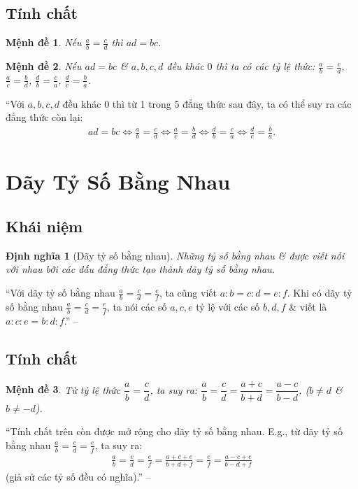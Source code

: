 \documentclass[oneside]{book}
\numberwithin{equation}{section}
\newtheorem{dinhnghia}{Định nghĩa}[section]
\newtheorem{menhde}{Mệnh đề}[section]
\begin{document}
\subsection{Tính chất}

\begin{menhde}
	Nếu $\frac{a}{b} = \frac{c}{d}$ thì $ad = bc$.
\end{menhde}

\begin{menhde}
	Nếu $ad = bc$ \& $a,b,c,d$ đều khác $0$ thì ta có các tỷ lệ thức: $\frac{a}{b} = \frac{c}{d}$, $\frac{a}{c} = \frac{b}{d}$, $\frac{d}{b} = \frac{c}{a}$, $\frac{d}{c} = \frac{b}{a}$.
\end{menhde}
``Với $a,b,c,d$ đều khác $0$ thì từ 1 trong 5 đẳng thức sau đây, ta có thể suy ra các đẳng thức còn lại:
\begin{align*}
	ad = bc\Leftrightarrow\frac{a}{b} = \frac{c}{d}\Leftrightarrow\frac{a}{c} = \frac{b}{d}\Leftrightarrow\frac{d}{b} = \frac{c}{a}\Leftrightarrow\frac{d}{c} = \frac{b}{a}.
\end{align*}

\section{Dãy Tỷ Số Bằng Nhau}

\subsection{Khái niệm}

\begin{dinhnghia}[Dãy tỷ số bằng nhau]
	Những tỷ số bằng nhau \& được viết nối với nhau bởi các dấu đẳng thức tạo thành \emph{dãy tỷ số bằng nhau}.
\end{dinhnghia}
``Với dãy tỷ số bằng nhau $\frac{a}{b} = \frac{c}{d} = \frac{e}{f}$, ta cũng viết $a:b = c:d = e:f$. Khi có dãy tỷ số bằng nhau $\frac{a}{b} = \frac{c}{d} = \frac{e}{f}$, ta nói các số $a,c,e$ tỷ lệ với các số $b,d,f$ \& viết là $a:c:e = b:d:f$.'' -- \cite[p. 55]{SGK_Toan_7_Canh_Dieu_tap_1}

\subsection{Tính chất}

\begin{menhde}
	Từ tỷ lệ thức $\dfrac{a}{b} = \dfrac{c}{d}$, ta suy ra: $\dfrac{a}{b} = \dfrac{c}{d} = \dfrac{a + c}{b + d} = \dfrac{a - c}{b - d}$, ($b\ne d$ \& $b\ne -d$).
\end{menhde}
``Tính chất trên còn được mở rộng cho dãy tỷ số bằng nhau. E.g., từ dãy tỷ số bằng nhau $\frac{a}{b} = \frac{c}{d} = \frac{e}{f}$, ta suy ra:
\begin{align*}
	\frac{a}{b} = \frac{c}{d} = \frac{e}{f} = \frac{a + c + e}{b + d + f} = \frac{e}{f} = \frac{a - c + e}{b - d + f}
\end{align*}
(giả sử các tỷ số đều có nghĩa).'' -- \cite[p. 56]{SGK_Toan_7_Canh_Dieu_tap_1}
\end{document}
